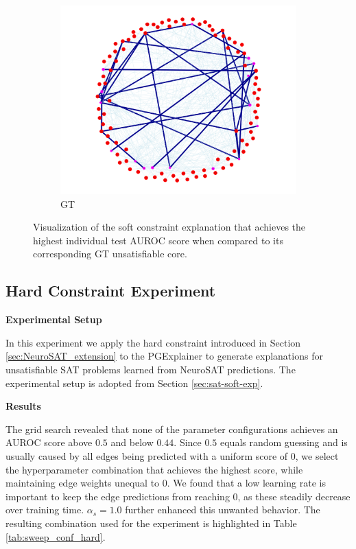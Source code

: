 \begin{figure}[h]
\begin{subfigure}[b]{0.3\textwidth}
        \label{fig:soft_shared}
    \end{subfigure}
    \begin{subfigure}[b]{0.3\textwidth}
        \includegraphics[width=\linewidth]{img/SAT-soft/2025-05-14 20_52_03-seed4_highestAUC_gt_TEST.html.png}
        \caption{\ac{GT}}
        \label{fig:soft_gt}
    \end{subfigure}
    \caption[Visualization of the best soft constraint explanation]{Visualization of the soft constraint explanation that achieves the highest individual test AUROC score when compared to its corresponding \ac{GT} unsatisfiable core.}
    \label{fig:soft_quant}
\end{figure}

\subsection{Hard Constraint Experiment}
\label{sec:sat-hard-exp}
\textbf{Experimental Setup}\par
In this experiment we apply the hard constraint introduced in Section \ref{sec:NeuroSAT_extension} to the PGExplainer to generate explanations for unsatisfiable SAT problems learned from NeuroSAT predictions. The experimental setup is adopted from Section \ref{sec:sat-soft-exp}. \bigskip

\textbf{Results}\par
The grid search revealed that none of the parameter configurations achieves an AUROC score above $0.5$ and below $0.44$. Since $0.5$ equals random guessing and is usually caused by all edges being predicted with a uniform score of 0, we select the hyperparameter combination that achieves the highest score, while maintaining edge weights unequal to 0. We found that a low learning rate is important to keep the edge predictions from reaching 0, as these steadily decrease over training time. $\alpha_s=1.0$ further enhanced this unwanted behavior. The resulting combination used for the experiment is highlighted in Table \ref{tab:sweep_conf_hard}. \bigskip

